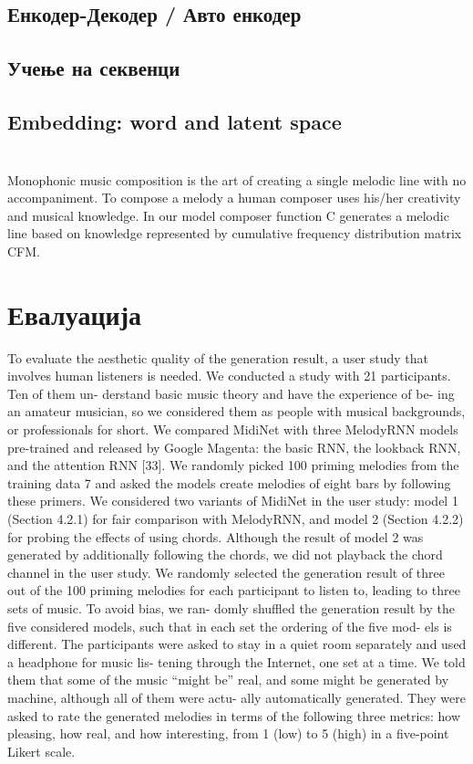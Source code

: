 \section{Енкодер-Декодер / Авто енкодер}

\section{Учење на секвенци}

\section{Embedding: word and latent space}

\chapter{}
Monophonic music composition is the art of creating a single melodic line with no accompaniment. To compose a melody a human composer uses his/her creativity and musical knowledge. In our model composer function C generates a melodic line based on knowledge represented by cumulative frequency distribution matrix CFM.

\chapter{Евалуација}

\cite{MidiNet} To evaluate the aesthetic quality of the generation result, a user study that involves human listeners is needed. We conducted a study with 21 participants. Ten of them un- derstand basic music theory and have the experience of be- ing an amateur musician, so we considered them as people with musical backgrounds, or professionals for short. We compared MidiNet with three MelodyRNN models pre-trained and released by Google Magenta: the basic RNN, the lookback RNN, and the attention RNN [33]. We randomly picked 100 priming melodies from the training data 7 and asked the models create melodies of eight bars by following these primers. We considered two variants of MidiNet in the user study: model 1 (Section 4.2.1) for fair comparison with MelodyRNN, and model 2 (Section 4.2.2) for probing the effects of using chords. Although the result of model 2 was generated by additionally following the chords, we did not playback the chord channel in the user study. We randomly selected the generation result of three out of the 100 priming melodies for each participant to listen to, leading to three sets of music. To avoid bias, we ran- domly shuffled the generation result by the five considered models, such that in each set the ordering of the five mod- els is different. The participants were asked to stay in a quiet room separately and used a headphone for music lis- tening through the Internet, one set at a time. We told them that some of the music “might be” real, and some might be generated by machine, although all of them were actu- ally automatically generated. They were asked to rate the generated melodies in terms of the following three metrics: how pleasing, how real, and how interesting, from 1 (low) to 5 (high) in a five-point Likert scale.


